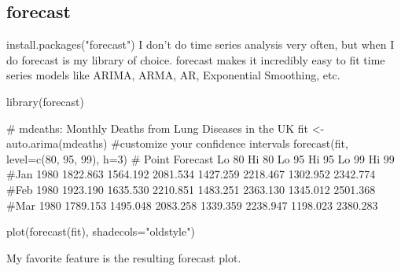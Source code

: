 
\subsection*{forecast}
install.packages("forecast")
I don't do time series analysis very often, but when I do forecast is my library of choice. forecast makes it incredibly easy to fit time series models like ARIMA, ARMA, AR, Exponential Smoothing, etc.


library(forecast)
 
# mdeaths: Monthly Deaths from Lung Diseases in the UK
fit <- auto.arima(mdeaths)
#customize your confidence intervals
forecast(fit, level=c(80, 95, 99), h=3)
#         Point Forecast    Lo 80    Hi 80    Lo 95    Hi 95    Lo 99    Hi 99
#Jan 1980       1822.863 1564.192 2081.534 1427.259 2218.467 1302.952 2342.774
#Feb 1980       1923.190 1635.530 2210.851 1483.251 2363.130 1345.012 2501.368
#Mar 1980       1789.153 1495.048 2083.258 1339.359 2238.947 1198.023 2380.283
 
plot(forecast(fit), shadecols="oldstyle")
 
 

My favorite feature is the resulting forecast plot.
